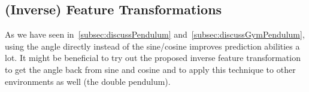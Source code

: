 	\subsection{(Inverse) Feature Transformations}
		As we have seen in~\ref{subsec:discussPendulum} and~\autoref{subsec:discussGymPendulum}, using the angle directly instead of the sine/cosine improves prediction abilities a lot. It might be beneficial to try out the proposed inverse feature transformation to get the angle back from sine and cosine and to apply this technique to other environments as well (\eg the double pendulum).
